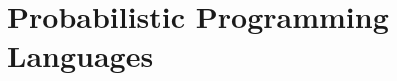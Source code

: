 \documentclass{article}
\begin{document}
%
%
%
%
%

\section{Probabilistic Programming Languages}
\end{document}
